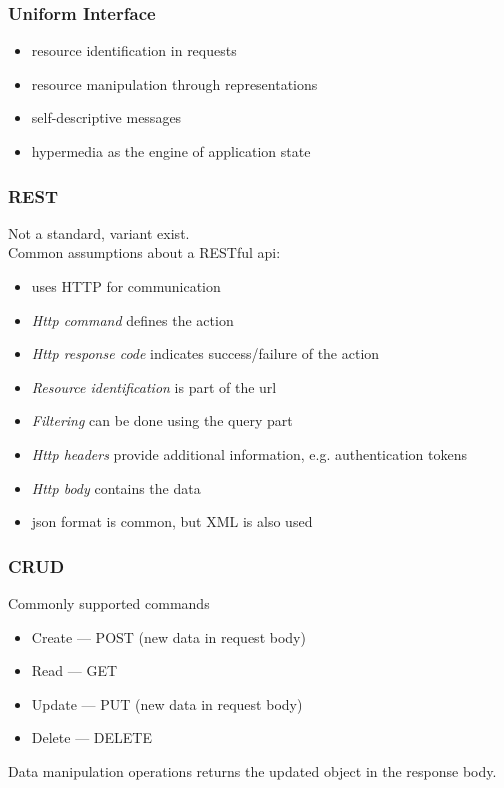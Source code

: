 \begin{frame}[fragile]\frametitle{Uniform Interface}
\begin{itemize}
 \item resource identification in requests
 \item resource manipulation through representations
 \item self-descriptive messages
 \item hypermedia as the engine of application state
\end{itemize}
\end{frame}

\begin{frame}[fragile]
\frametitle{REST}
Not a standard, variant exist.
\vspace{3mm}
\\Common assumptions about a RESTful api:
\begin{itemize}
  \item uses HTTP for communication
  \item \emph{Http command} defines the action
  \item \emph{Http response code} indicates success/failure of the action
  \item \emph{Resource identification} is part of the url
  \item \emph{Filtering} can be done using the query part
  \item \emph{Http headers} provide additional information, e.g. authentication tokens
  \item \emph{Http body} contains the data
  \item {json format} is common, but XML is also used
\end{itemize}
\end{frame}


\begin{frame}[fragile]
\frametitle{CRUD}
Commonly supported commands
\begin{itemize}
  \item Create --- POST (new data in request body)
  \item Read --- GET
  \item Update --- PUT (new data in request body)
  \item Delete --- DELETE
\end{itemize}
\vspace{5mm}
Data manipulation operations returns the updated object in the response body.
\end{frame}

